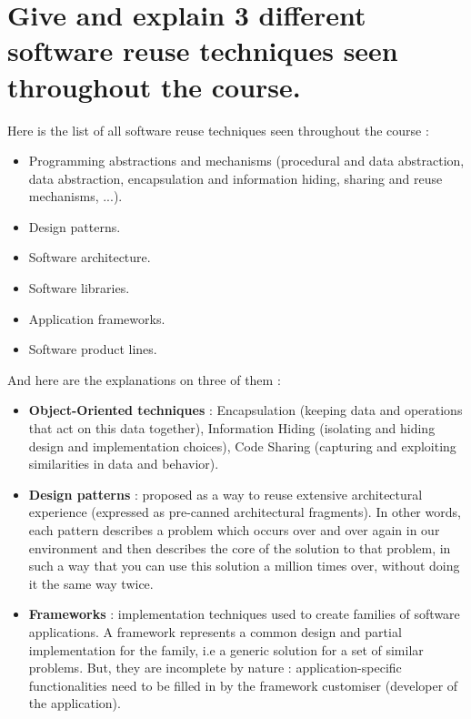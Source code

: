 \section{Give and explain 3 different software reuse techniques seen throughout the course.}

Here is the list of all software reuse techniques seen throughout the course :
\begin{itemize}
\item Programming abstractions and mechanisms (procedural and data abstraction, data abstraction, encapsulation 
and information hiding, sharing and reuse mechanisms, ...).
\item Design patterns. 
\item Software architecture.
\item Software libraries. 
\item Application frameworks.
\item Software product lines.
\end{itemize}

And here are the explanations on three of them :
\begin{itemize}
\item \textbf{Object-Oriented techniques} : Encapsulation (keeping data and operations that act on this data together), Information Hiding (isolating and hiding design and implementation choices), Code Sharing (capturing and exploiting similarities in data and behavior).\\

\item \textbf{Design patterns} : proposed as a way to reuse extensive architectural experience (expressed as pre-canned architectural fragments). In other words, each pattern describes a problem which occurs over and over again in our environment and then describes the core of the solution to that problem, in such a way that you can use this solution a million times over, without doing it the same way twice.\\

\item \textbf{Frameworks} : implementation techniques used to create families of software applications. A framework represents a common design and partial implementation for the family, i.e a generic solution for a set of similar problems. But, they are incomplete by nature : application-specific functionalities need to be 
filled in by the framework customiser (developer of the application).
\end{itemize}

